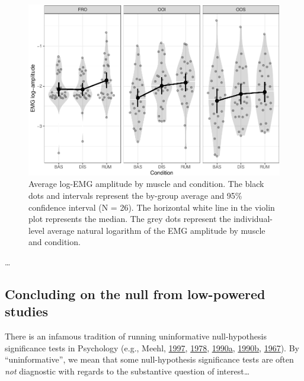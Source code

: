 \documentclass[
  english,
  man,floatsintext]{apa6}
\begin{document}
\begin{figure}[!htb]

{\centering \includegraphics[width=1\linewidth]{reanalysis_files/figure-latex/general-1} 

}

\caption{Average log-EMG amplitude by muscle and condition. The black dots and intervals represent the by-group average and 95\% confidence interval (N = 26). The horizontal white line in the violin plot represents the median. The grey dots represent the individual-level average natural logarithm of the EMG amplitude by muscle and condition.}\label{fig:general}
\end{figure}

\ldots{}

\hypertarget{concluding-on-the-null-from-low-powered-studies}{%
\subsection{Concluding on the null from low-powered studies}\label{concluding-on-the-null-from-low-powered-studies}}

There is an infamous tradition of running uninformative null-hypothesis significance tests in Psychology (e.g., Meehl, \protect\hyperlink{ref-harlow_problem_1997}{1997}, \protect\hyperlink{ref-meehl_theoretical_1978}{1978}, \protect\hyperlink{ref-meehl_why_1990}{1990}\protect\hyperlink{ref-meehl_why_1990}{a}, \protect\hyperlink{ref-meehl_appraising_1990-1}{1990}\protect\hyperlink{ref-meehl_appraising_1990-1}{b}, \protect\hyperlink{ref-meehl_theory-testing_1967}{1967}). By ``uninformative'', we mean that some null-hypothesis significance tests are often \emph{not} diagnostic with regards to the substantive question of interest\ldots{}
\end{document}

